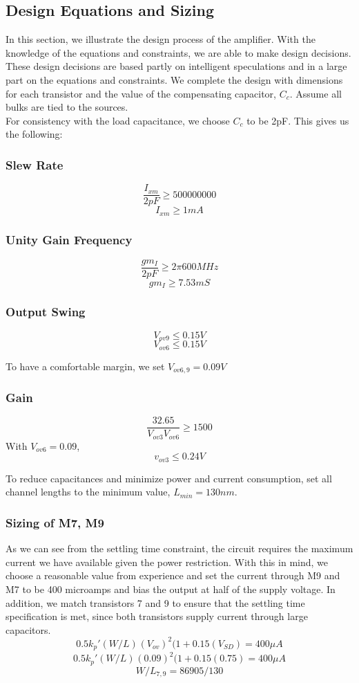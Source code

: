 \documentclass[]{article}
\begin{document}
		\subsection{Design Equations and Sizing}
			In this section, we illustrate the design process of the amplifier. With the knowledge of the equations and constraints, we are able to make design decisions. These design decisions are based partly on intelligent speculations and in a large part on the equations and constraints. We complete the design with dimensions for each transistor and the value of the compensating capacitor, $C_{c}$. Assume all bulks are tied to the sources.
			$$$$
			For consistency with the load capacitance, we choose $C_{c}$ to be 2pF. This gives us the following:
			\subsubsection{Slew Rate}
				$$\frac{I_{xm}}{2pF} \ge 500 000 000 $$
				$$I_{xm} \ge 1mA$$
		
			\subsubsection{Unity Gain Frequency}
				$$\frac{gm_{I}}{2pF} \ge 2\pi 600 MHz $$
				$$gm_{I} \ge 7.53mS$$
		
			\subsubsection{Output Swing}
			$$V_{ov9} \le 0.15V$$
			$$V_{ov6} \le 0.15V$$

			To have a comfortable margin, we set $V_{ov6,9} = 0.09 V$	
		
			\subsubsection{Gain}
				$$\frac{32.65}{V_{ov3}V_{ov6}} \ge 1500$$
				With $V_{ov6} = 0.09$,
				$$v_{ov3} \le 0.24 V $$
				$$$$

				\pagebreak
		
			
			To reduce capacitances and minimize power and current consumption, set all channel lengths to the minimum value, $L_{min} = 130 nm$.
			\subsubsection{Sizing of M7, M9}
				$$$$
				As we can see from the settling time constraint, the circuit requires the maximum current we have available given the power restriction. With this in mind, we choose a reasonable value from experience and set the current through M9 and M7 to be 400 microamps and bias the output at half of the supply voltage. In addition, we match transistors 7 and 9 to ensure that the settling time specification is met, since both transistors supply current through large capacitors.
				$$0.5k_{p}'(W/L)_{}(V_{ov})^2(1+0.15(V_{SD}) = 400 \mu A $$
				$$0.5k_{p}'(W/L)_{}(0.09)^2(1+0.15(0.75) = 400 \mu A $$
				$$W/L_{7,9} = 86905/130$$
			
\end{document}
